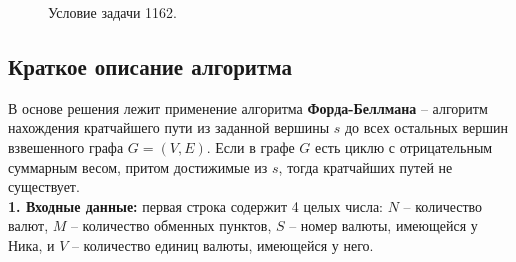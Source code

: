 \documentclass[a5paper, 10pt]{article}
\theoremstyle{definition}
\theoremstyle{plain}
\theoremstyle{remark}
\begin{document}
\begin{figure}[h!]
\caption{Условие задачи 1162.}
\end{figure}

\subsection{Краткое описание алгоритма}

В основе решения лежит применение алгоритма \textbf{Форда-Беллмана} -- алгоритм нахождения кратчайшего пути из заданной вершины $s$ до всех остальных вершин взвешенного графа $G = \left( V, E \right)$. Если в графе $G$ есть циклю с отрицательным суммарным весом, притом достижимые из $s$, тогда кратчайших путей не существует.\\

\textbf{1. Входные данные:} первая строка содержит 4 целых числа: $N$ -- количество валют, $M$ -- количество обменных пунктов, $S$ -- номер валюты, имеющейся у Ника, и $V$ -- количество единиц валюты, имеющейся у него. \\
\end{document}
